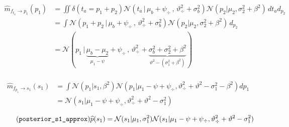 \documentclass[article]{jss}
\newif\ifen
\newif\ifes
\newcommand{\en}[1]{\ifen#1\fi}
\newcommand{\es}[1]{\ifes#1\fi}
\newcommand{\N}{\mathcal{N}}
\begin{document}
%
\en{The approximate message sent by team performance factor $f_{t_a}$ to the winning individual performance variables $p_1$ is,}
\es{El mensaje aproximado que el factor desempeño de equipo $f_{t_a}$ envía a la variables de desempeño individual $p_1$ es,}
%
\begin{equation}%
\begin{split}
\widehat{m}_{f_{t_a} \rightarrow p_1}(p_1) &= \iint \delta(t_a = p_1 + p_2) \N(t_a \, | \, \mu_b + \psi_{\div} \, , \, \vartheta_{\div}^2 + \sigma_b^2) \N(p_2 | \mu_2 , \sigma_2^2 + \beta^2)  \, d{t_a} d_{p_2} \\
& = \int \N(p_1 + p_2 \, | \, \mu_b + \psi_{\div} \, , \, \vartheta_{\div}^2 + \sigma_b^2) \N(p_2 | \mu_2 , \sigma_2^2+ \beta^2 )   \, d_{p_2} \\
& = \N( p_1 \,|\,  \underbrace{\mu_b - \mu_2}_{\mu_1-\psi} + \psi_{\div}  \,,\,\vartheta_{\div}^2 + \underbrace{\sigma_b^2 + \sigma_2^2 + \beta^2}_{\vartheta^2 - (\sigma_1^2 + \beta^2)})  \\
\end{split}
\end{equation}
%
\en{The approximate message sent by the individual performance factor $f_{p_1}$ to the winning skill variables $s_1$ is,}
\es{El mensaje aproximado que el factor de desempeño individual $f_{p_1}$ envía a la variables de habilidad $s_1$ es,}
%
\begin{equation}%
\begin{split}
\widehat{m}_{f_{p_1} \rightarrow s_1}(s_1) & = \int \N(p_1|s_1,\beta^2) \N(p_1| \mu_1 - \psi + \psi_{\div}, \vartheta_{\div}^2 + \vartheta^2 - \sigma_1^2 - \beta^2)dp_1 \\
& = \N(s_1| \mu_1 - \psi + \psi_{\div}, \vartheta_{\div}^2 + \vartheta^2 - \sigma_1^2)
\end{split}
\end{equation}
%
\en{Finally, the approximate proportional posterior of the variable $s_1$ is obtained by multiplying the messages it receives from its neighboring factors.}
\es{Finalmente, el posterior proporcional aproximado de la variable $s_1$ se obtiene multiplicando los mensajes que recibe de sus factores vecinos.}
%
\begin{equation}\label{eq:^p_s} \tag{\texttt{posterior\_s1\_approx}}
 \widehat{p}(s_1) = \N(s_1|\mu_1, \sigma_1^2) \N(s_1| \mu_1 - \psi + \psi_{\div}, \vartheta_{\div}^2 + \vartheta^2 - \sigma_1^2)
\end{equation}
\end{document}
